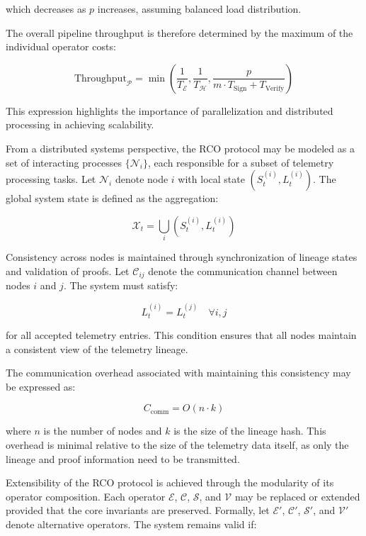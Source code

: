 which decreases as $p$ increases, assuming balanced load distribution.

The overall pipeline throughput is therefore determined by the maximum of the individual operator costs:

\begin{equation}
\text{Throughput}_{\mathcal{P}} = \min \left( \frac{1}{T_{\mathcal{E}}}, \frac{1}{T_{\mathcal{H}}}, \frac{p}{m \cdot T_{\text{Sign}} + T_{\text{Verify}}} \right)
\end{equation}

This expression highlights the importance of parallelization and distributed processing in achieving scalability.

From a distributed systems perspective, the RCO protocol may be modeled as a set of interacting processes $\{\mathcal{N}_i\}$, each responsible for a subset of telemetry processing tasks. Let $\mathcal{N}_i$ denote node $i$ with local state $(S_t^{(i)}, L_t^{(i)})$. The global system state is defined as the aggregation:

\begin{equation}
\mathcal{X}_t = \bigcup_{i} (S_t^{(i)}, L_t^{(i)})
\end{equation}

Consistency across nodes is maintained through synchronization of lineage states and validation of proofs. Let $\mathcal{C}_{ij}$ denote the communication channel between nodes $i$ and $j$. The system must satisfy:

\begin{equation}
L_t^{(i)} = L_t^{(j)} \quad \forall i,j
\end{equation}

for all accepted telemetry entries. This condition ensures that all nodes maintain a consistent view of the telemetry lineage.

The communication overhead associated with maintaining this consistency may be expressed as:

\begin{equation}
C_{\text{comm}} = O(n \cdot k)
\end{equation}

where $n$ is the number of nodes and $k$ is the size of the lineage hash. This overhead is minimal relative to the size of the telemetry data itself, as only the lineage and proof information need to be transmitted.

Extensibility of the RCO protocol is achieved through the modularity of its operator composition. Each operator $\mathcal{E}$, $\mathcal{C}$, $\mathcal{S}$, and $\mathcal{V}$ may be replaced or extended provided that the core invariants are preserved. Formally, let $\mathcal{E}'$, $\mathcal{C}'$, $\mathcal{S}'$, and $\mathcal{V}'$ denote alternative operators. The system remains valid if:

